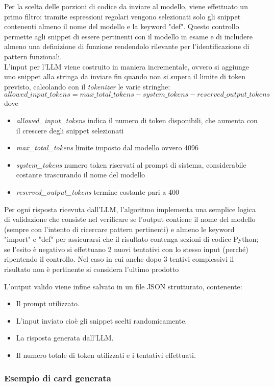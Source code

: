 \documentclass{article}
\begin{document}
\begin{itemize}
Per la scelta delle porzioni di codice da inviare al modello, viene effettuato un primo filtro: tramite espressioni regolari vengono selezionati solo gli snippet contenenti almeno il nome del modello e la keyword "def". Questo controllo permette agli snippet di essere pertinenti con il modello in esame e di includere almeno una definizione di funzione rendendolo rilevante per l'identificazione di pattern funzionali.\\
L'input per l'LLM viene costruito in maniera incrementale, ovvero si aggiunge uno snippet alla stringa da inviare fin quando non si supera il limite di token previsto, calcolando con il \textit{tokenizer} le varie stringhe:
\[
allowed\_input\_tokens = max\_total\_tokens - system\_tokens - reserved\_output\_tokens
\]
dove
\begin{itemize}
    \item \textit{allowed\_input\_tokens} indica il numero di token disponibili, che aumenta con il crescere degli snippet selezionati
    \item \textit{max\_total\_tokens} limite imposto dal modello ovvero 4096
    \item \textit{system\_tokens} numero token riservati al prompt di sistema, considerabile costante trascurando il nome del modello
    \item \textit{reserved\_output\_tokens} termine costante pari a 400
\end{itemize}
Per ogni risposta ricevuta dall'LLM, l'algoritmo implementa una semplice logica di validazione che consiste nel verificare se l'output contiene il nome del modello (sempre con l'intento di ricercare pattern pertinenti) e almeno le keyword "import" e "def" per assicurarsi che il risultato contenga sezioni di codice Python; se l'esito è negativo si effettuano 2 nuovi tentativi con lo stesso input (perché) ripentendo il controllo. Nel caso in cui anche dopo 3 tentivi complessivi il risultato non è pertinente si considera l'ultimo prodotto  


L’output valido viene infine salvato in un file JSON strutturato, contenente:  
\begin{itemize}
    \item Il prompt utilizzato.
    \item L'input inviato cioè gli snippet scelti randomicamente.
    \item La risposta generata dall’LLM.
    \item Il numero totale di token utilizzati e i tentativi effettuati.
\end{itemize}

\subsubsection{Esempio di card generata}


    
\end{itemize}
\end{document}
